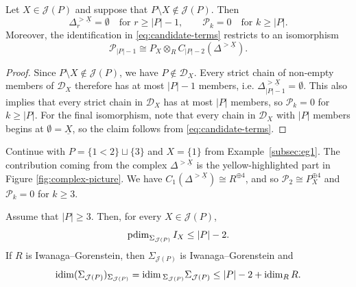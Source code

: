 \documentclass[a4paper,leqno]{amsart}
\begin{document}
\begin{lem}\label{lem:chain-degree-bound}
Let $X\in\mathcal J(P)$ and suppose that $P\setminus X\notin\mathcal J(P)$. Then
\[
\Delta^{>\underline X}_r=\emptyset
\quad\text{for }r\geq|P|-1,
\qquad
\mathcal P_k=0
\quad\text{for }k\geq|P|.
\]
Moreover, the identification in \eqref{eq:candidate-terms} restricts to an isomorphism
\[
\mathcal P_{|P|-1}
\cong P_X\otimes_R C_{|P|-2}(\Delta^{>\underline X}).
\]
\end{lem}

\begin{proof}
Since $P\setminus X\notin\mathcal J(P)$, we have $P\notin\mathcal D_X$. Every strict chain of non-empty members of $\mathcal D_X$ therefore has at most $|P|-1$ members, i.e. $\Delta^{>\underline X}_{|P|-1}=\emptyset$.   This also implies that every strict chain in $\mathcal D_X$ has at most $|P|$ members, so $\mathcal P_k=0$ for $k\geq|P|$. For the final isomorphism, note that every chain in $\mathcal D_X$ with $|P|$ members begins at $\emptyset=\underline X$, so the claim follows from \eqref{eq:candidate-terms}.
\end{proof}

\begin{eg}\label{eg:chain-degree-bound}
Continue with $P=\{1<2\}\sqcup\{3\}$ and $X=\{1\}$ from Example~\ref{subsec:eg1}. The contribution coming from the complex $\Delta^{>\underline X}$ is the yellow-highlighted part in Figure \ref{fig:complex-picture}.  We have $C_1(\Delta^{>\underline X})\cong R^{\oplus 4}$, and so $\mathcal{P}_2\cong P_X^{\oplus 4}$ and $\mathcal{P}_k=0$ for $k\ge 3$.
\end{eg}


\begin{prop}\label{prop:n-2-inequalities}
Assume that $|P|\geq3$. Then, for every $X\in\mathcal J(P)$,
\[
\operatorname{pdim}_{\Sigma_{\mathcal J(P)}}I_X\leq |P|-2.
\]
If $R$ is Iwanaga--Gorenstein, then $\Sigma_{\mathcal J(P)}$ is Iwanaga--Gorenstein and
\[
\operatorname{idim}(\Sigma_{\mathcal J(P)})_{\Sigma_{\mathcal J(P)}}
=\operatorname{idim}{}_{\Sigma_{\mathcal J(P)}}\Sigma_{\mathcal J(P)}
\leq |P|-2+\operatorname{idim}_R R.
\]
\end{prop}
\end{document}
